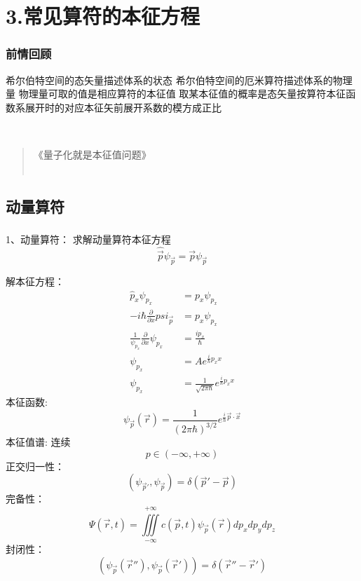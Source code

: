 

\section{3.常见算符的本征方程}

\begin{frame}
    \frametitle{前情回顾}
    \begin{itemize}
        \Item 希尔伯特空间的态矢量描述体系的状态
        \Item 希尔伯特空间的厄米算符描述体系的物理量
        \Item 物理量可取的值是相应算符的本征值
        \Item 取某本征值的概率是态矢量按算符本征函数系展开时的对应本征矢前展开系数的模方成正比
    \end{itemize} 
    ~~ \\ \vspace{0.8em}
    \begin{quote}
     《量子化就是本征值问题》\\
     ~~\\
    \end{quote}
\end{frame} 


\subsection{动量算符}

\begin{frame} [allowframebreaks=]
    \frametitle{}
    \begin{tcolorbox1}{1、动量算符：}
    求解动量算符本征方程  
    \[\hat{\vec p}\psi_{\vec p}=\vec p \psi_{\vec p}\]   
    \end{tcolorbox1}
    \alert{ 解本征方程：}  
    \begin{equation*}
        \begin{split}
            \hat{p}_x\psi_{p_x}&=p_x \psi_{p_x} \\
            -i\hbar\frac{\partial}{\partial x} psi_{\vec p} &= p_x \psi_{p_x}\\
            \frac{1}{\psi_{p_{x}}} \frac{\partial}{\partial x} \psi_{p_{x}}&=\frac{i p_{x}}{\hbar}\\
            \psi_{p_{x}}&=Ae^{\frac{i}{\hbar}p_x x} \\
            \psi_{p_{x}}&=\frac{1}{\sqrt{2\pi\hbar}}e^{\frac{i}{\hbar}p_x x}
        \end{split} 
    \end{equation*}
    本征函数: $$ \psi_{\vec{p}}(\vec{r})=\frac{1}{(2\pi\hbar)^{3/2}}e^{\frac{i}{\hbar}\vec{p}\cdot \vec{x}}   $$
    本征值谱: 连续
        $$ p \in (-\infty, +\infty) $$
    正交归一性：
        $$ (\psi_{\vec{p}'}, \psi_{\vec{p}}) =\delta(\vec{p}'-\vec{p})$$
    完备性：
    $$ \Psi(\vec{r},t)=\iiint\limits_{-\infty}^{+\infty}c(\vec{p},t) \psi_{\vec{p}}(\vec{r}) dp_xdp_ydp_z $$
    封闭性：$$ (\psi_{\vec{p}}(\vec{r}''), \psi_{\vec{p}}(\vec{r}')) =\delta(\vec{r}''-\vec{r}')$$
\end{frame} 

